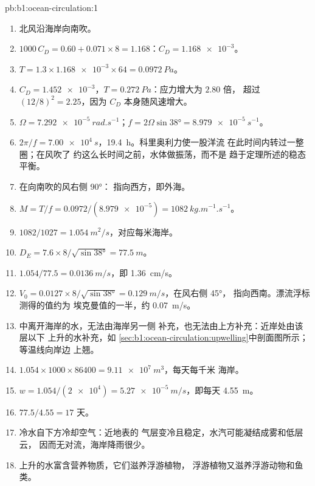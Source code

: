 \begin{solution}{pb:b1:ocean-circulation:1}
\begin{enumerate}
  \item 北风沿海岸向南吹。
  \item $1000\,C_D = 0.60 + 0.071 \times 8 = 1.168$：$C_D = \num{1.168e-3}$。
  \item $T = 1.3 \times \num{1.168e-3} \times 64 = \qty{0.0972}{Pa}$。
  \item $C_D = \num{1.452e-3}$，$T = \qty{0.272}{Pa}$：应力增大为 $2.80$ 倍，
        超过 $(12/8)^2 = 2.25$，因为 $C_D$ 本身随风速增大。
  \item $\Omega = \qty{7.292e-5}{rad.s^{-1}}$；$f = 2\Omega\sin\ang{38} =
        \qty{8.979e-5}{s^{-1}}$。
  \item $2\pi/f = \qty{7.00e4}{s}$，\qty{19.4}{h}。科里奥利力使一股洋流
        在此时间内转过一整圈；在风吹了
        约这么长时间之前，水体做振荡，而不是
        趋于定理所述的稳态平衡。
  \item 在向南吹的风右侧 \ang{90}：
        指向西方，即外海。
  \item $M = T/f = 0.0972/(\num{8.979e-5}) = \qty{1082}{kg.m^{-1}.s^{-1}}$。
  \item $1082/1027 = \qty{1.054}{m^2/s}$，对应每米海岸。
  \item $D_E = 7.6 \times 8/\sqrt{\sin\ang{38}} = \qty{77.5}{m}$。
  \item $1.054/77.5 = \qty{0.0136}{m/s}$，即 \qty{1.36}{cm/s}。
  \item $V_0 = 0.0127 \times 8/\sqrt{\sin\ang{38}} = \qty{0.129}{m/s}$，在风右侧 \ang{45}，
        指向西南。漂流浮标测得的值约为
        埃克曼值的一半，约 \qty{0.07}{m/s}。
  \item {}中离开海岸的水，无法由海岸另一侧
        补充，也无法由上方补充：近岸处由该层以下
        上升的水补充，如
        \cref{sec:b1:ocean-circulation:upwelling}中剖面图所示；等温线向岸边
        上翘。
  \item $1.054 \times 1000 \times 86400 = \qty{9.11e7}{m^3}$，每天每千米
        海岸。
  \item $w = 1.054/(\num{2e4}) = \qty{5.27e-5}{m/s}$，即每天 \qty{4.55}{m}。
  \item $77.5/4.55 = 17$ 天。
  \item 冷水自下方冷却空气：近地表的
        气层变冷且稳定，水汽可能凝结成雾和低层云，
        因而无对流，海岸降雨很少。
  \item 上升的水富含营养物质，它们滋养浮游植物，
        浮游植物又滋养浮游动物和鱼类。

\end{enumerate}
\end{solution}
